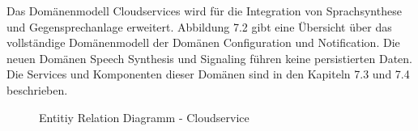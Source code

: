 Das Domänenmodell Cloudservices wird für die Integration von Sprachsynthese und Gegensprechanlage erweitert.
Abbildung 7.2 gibt eine Übersicht über das vollständige Domänenmodell der Domänen Configuration und Notification.
Die neuen Domänen Speech Synthesis und Signaling führen keine persistierten Daten.
Die Services und Komponenten dieser Domänen sind in den Kapiteln 7.3 und 7.4 beschrieben.

\begin{figure}[h]
    \centering
    \begin{minipage}[b]{0.9\textwidth}
        \caption{Entitiy Relation Diagramm - Cloudservice}
    \end{minipage}
\end{figure}

\clearpage
